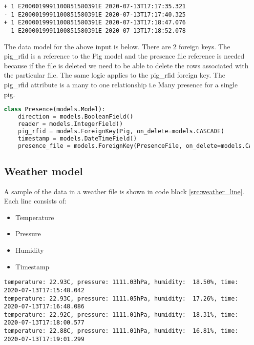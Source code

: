 \begin{lstlisting}[language={}]
+ 1 E2000019991100851580391E 2020-07-13T17:17:35.321 
- 1 E2000019991100851580391E 2020-07-13T17:17:40.325 
+ 1 E2000019991100851580391E 2020-07-13T17:18:47.076 
- 1 E2000019991100851580391E 2020-07-13T17:18:52.078 
\end{lstlisting}

The data model for the above input is below. There are 2 foreign keys. The pig\_rfid is a reference to the Pig model and the presence file reference
is needed because if the file is deleted we need to be able to delete the rows associated with the particular file. The same logic
applies to the pig\_rfid foreign key. The pig\_rfid attribute is a many to one relationship i.e Many presence for a single pig.

\begin{lstlisting}[language={Python}]
class Presence(models.Model):
    direction = models.BooleanField()
    reader = models.IntegerField()
    pig_rfid = models.ForeignKey(Pig, on_delete=models.CASCADE)
    timestamp = models.DateTimeField()
    presence_file = models.ForeignKey(PresenceFile, on_delete=models.CASCADE)
\end{lstlisting}

\subsection{Weather model}
A sample of the data in a weather file is shown in code block \ref{src:weather_line}. Each line consists of:
\begin{itemize}
    \item Temperature
    \item Pressure
    \item Humidity
    \item Timestamp
\end{itemize}

\begin{lstlisting}[language={}]
temperature: 22.93C, pressure: 1111.03hPa, humidity:  18.50%, time: 2020-07-13T17:15:48.042
temperature: 22.93C, pressure: 1111.05hPa, humidity:  17.26%, time: 2020-07-13T17:16:48.086
temperature: 22.92C, pressure: 1111.01hPa, humidity:  18.31%, time: 2020-07-13T17:18:00.577
temperature: 22.88C, pressure: 1111.01hPa, humidity:  16.81%, time: 2020-07-13T17:19:01.299
\end{lstlisting}

